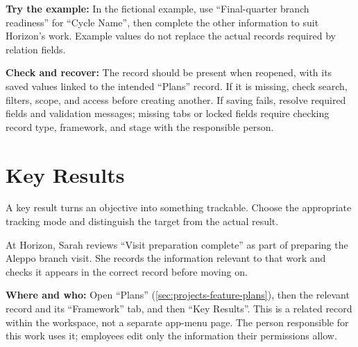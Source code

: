 \textbf{Try the example:} In the fictional example, use “Final-quarter branch readiness” for “Cycle Name”, then complete the other information to suit Horizon's work. Example values do not replace the actual records required by relation fields.

\textbf{Check and recover:} The record should be present when reopened, with its saved values linked to the intended “Plans” record. If it is missing, check search, filters, scope, and access before creating another. If saving fails, resolve required fields and validation messages; missing tabs or locked fields require checking record type, framework, and stage with the responsible person.

\clearpage
\section{Key Results}
\label{sec:projects-feature-planning-key-results}

A key result turns an objective into something trackable. Choose the appropriate tracking mode and distinguish the target from the actual result.

\begin{rcnote}
At Horizon, Sarah reviews “Visit preparation complete” as part of preparing the Aleppo branch visit. She records the information relevant to that work and checks it appears in the correct record before moving on.
\end{rcnote}

\textbf{Where and who:} Open “Plans” (\ref{sec:projects-feature-plans}), then the relevant record and its “Framework” tab, and then “Key Results”. This is a related record within the workspace, not a separate app-menu page. The person responsible for this work uses it; employees edit only the information their permissions allow.

